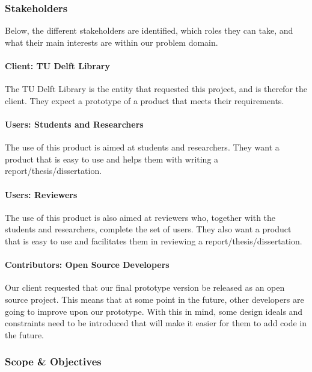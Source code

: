 \subsubsection{Stakeholders} %

Below, the different stakeholders are identified, which roles they can take, and what their main interests are within our problem domain.

\paragraph{Client: TU Delft Library} The TU Delft Library is the entity that requested this project, and is therefor the client. They expect a prototype of a product that meets their requirements.

\paragraph{Users: Students and Researchers} The use of this product is aimed at students and researchers. They want a product that is easy to use and helps them with writing a report/thesis/dissertation.

\paragraph{Users: Reviewers} The use of this product is also aimed at reviewers who, together with the students and researchers, complete the set of users. They also want a product that is easy to use and facilitates them in reviewing a report/thesis/dissertation.

\paragraph{Contributors: Open Source Developers} Our client requested that our final prototype version be released as an open source project. This means that at some point in the future, other developers are going to improve upon our prototype. With this in mind, some design ideals and constraints need to be introduced that will make it easier for them to add code in the future.

\subsubsection{Scope \& Objectives}

